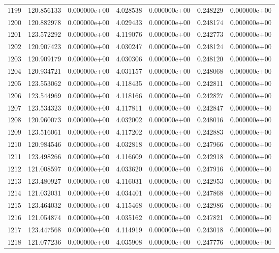 \begin{tabular}{rrrrrrr}
1199 & 120.856133 &  0.000000e+00 &  4.028538 &  0.000000e+00 &    0.248229 &  0.000000e+00 \\
1200 & 120.882978 &  0.000000e+00 &  4.029433 &  0.000000e+00 &    0.248174 &  0.000000e+00 \\
1201 & 123.572292 &  0.000000e+00 &  4.119076 &  0.000000e+00 &    0.242773 &  0.000000e+00 \\
1202 & 120.907423 &  0.000000e+00 &  4.030247 &  0.000000e+00 &    0.248124 &  0.000000e+00 \\
1203 & 120.909179 &  0.000000e+00 &  4.030306 &  0.000000e+00 &    0.248120 &  0.000000e+00 \\
1204 & 120.934721 &  0.000000e+00 &  4.031157 &  0.000000e+00 &    0.248068 &  0.000000e+00 \\
1205 & 123.553062 &  0.000000e+00 &  4.118435 &  0.000000e+00 &    0.242811 &  0.000000e+00 \\
1206 & 123.544969 &  0.000000e+00 &  4.118166 &  0.000000e+00 &    0.242827 &  0.000000e+00 \\
1207 & 123.534323 &  0.000000e+00 &  4.117811 &  0.000000e+00 &    0.242847 &  0.000000e+00 \\
1208 & 120.960073 &  0.000000e+00 &  4.032002 &  0.000000e+00 &    0.248016 &  0.000000e+00 \\
1209 & 123.516061 &  0.000000e+00 &  4.117202 &  0.000000e+00 &    0.242883 &  0.000000e+00 \\
1210 & 120.984546 &  0.000000e+00 &  4.032818 &  0.000000e+00 &    0.247966 &  0.000000e+00 \\
1211 & 123.498266 &  0.000000e+00 &  4.116609 &  0.000000e+00 &    0.242918 &  0.000000e+00 \\
1212 & 121.008597 &  0.000000e+00 &  4.033620 &  0.000000e+00 &    0.247916 &  0.000000e+00 \\
1213 & 123.480927 &  0.000000e+00 &  4.116031 &  0.000000e+00 &    0.242953 &  0.000000e+00 \\
1214 & 121.032031 &  0.000000e+00 &  4.034401 &  0.000000e+00 &    0.247868 &  0.000000e+00 \\
1215 & 123.464032 &  0.000000e+00 &  4.115468 &  0.000000e+00 &    0.242986 &  0.000000e+00 \\
1216 & 121.054874 &  0.000000e+00 &  4.035162 &  0.000000e+00 &    0.247821 &  0.000000e+00 \\
1217 & 123.447568 &  0.000000e+00 &  4.114919 &  0.000000e+00 &    0.243018 &  0.000000e+00 \\
1218 & 121.077236 &  0.000000e+00 &  4.035908 &  0.000000e+00 &    0.247776 &  0.000000e+00 \\

\end{tabular}
